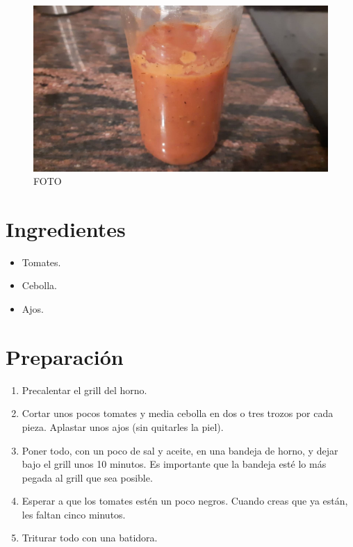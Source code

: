 \documentclass[
]{book}
\providecommand{\tightlist}{%
  \setlength{\itemsep}{0pt}\setlength{\parskip}{0pt}}
\begin{document}
\begin{figure}
\centering
\includegraphics{images/salsa-de-tomate-asado.jpg}
\caption{FOTO}
\end{figure}

\hypertarget{ingredientes-12}{%
\section*{Ingredientes}\label{ingredientes-12}}

\begin{itemize}
\tightlist
\item
  Tomates.
\item
  Cebolla.
\item
  Ajos.
\end{itemize}

\hypertarget{preparaciuxf3n-12}{%
\section*{Preparación}\label{preparaciuxf3n-12}}

\begin{enumerate}
\def\labelenumi{\arabic{enumi}.}
\tightlist
\item
  Precalentar el grill del horno.
\item
  Cortar unos pocos tomates y media cebolla en dos o tres trozos por cada pieza. Aplastar unos ajos (sin quitarles la piel).
\item
  Poner todo, con un poco de sal y aceite, en una bandeja de horno, y dejar bajo el grill unos 10 minutos. Es importante que la bandeja esté lo más pegada al grill que sea posible.
\item
  Esperar a que los tomates estén un poco negros. Cuando creas que ya están, les faltan cinco minutos.
\item
  Triturar todo con una batidora.
\end{enumerate}

  
\end{document}
